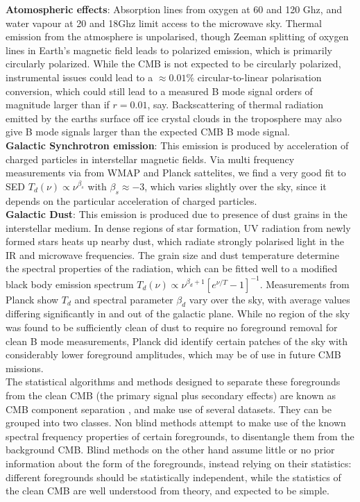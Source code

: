 \documentclass[a4paper,10pt]{article}
\begin{document}
\textbf{Atomospheric effects}: Absorption lines from oxygen at 60 and 120 Ghz, and water vapour at 20 and 18Ghz limit access to the microwave sky. Thermal emission from the atmosphere is unpolarised, though Zeeman splitting of oxygen lines in Earth's magnetic field leads to polarized emission, which is primarily circularly polarized. While the CMB is not expected to be circularly polarized, instrumental issues could lead to a $\approx 0.01\%$ circular-to-linear polarisation conversion, which could still lead to a measured B mode signal orders of magnitude larger than if $r=0.01$, say. Backscattering of thermal radiation emitted by the earths surface off ice  crystal clouds in the troposphere may also give B mode signals larger than the expected CMB B mode signal. \\

\textbf{Galactic Synchrotron emission}: This emission is produced by acceleration of charged particles in interstellar magnetic fields. Via multi frequency measurements via from WMAP and Planck sattelites, we find a very good fit to SED $T_d(\nu) \propto \nu^{\beta_s}$ with $\beta_s \approx -3$, which varies slightly over the sky, since it depends on the particular acceleration of charged particles.\\

\textbf{Galactic Dust}: This emission is produced due to presence of dust grains in the interstellar medium. In dense regions of star formation, UV radiation from newly formed stars heats up nearby dust, which radiate strongly polarised light in the IR and microwave frequencies. The grain size and dust temperature determine the spectral properties of the radiation, which can be fitted well to a modified black body emission spectrum $T_d(\nu) \propto \nu ^ {\beta_d+1}[e^{\nu/T}-1]^{-1}$. Measurements from Planck show $T_d$ and spectral parameter $\beta_d$ vary over the sky, with average values differing significantly in and out of the galactic plane. While no region of the sky was found to be sufficiently clean of dust to require no foreground removal for clean B mode measurements, Planck did identify certain patches of the sky with considerably lower foreground amplitudes, which may be of use in future CMB missions. \\

The statistical algorithms and methods designed to separate these foregrounds from the clean CMB (the primary signal plus secondary effects) are known as CMB component separation \cite{componentsep}, and make use of several datasets. They can be grouped into two classes. Non blind methods attempt to make use of the known spectral frequency properties of certain foregrounds, to disentangle them from the background CMB. Blind methods on the other hand assume little or no prior information about the form of the foregrounds, instead relying on their statistics: different foregrounds should be statistically independent, while the statistics of the clean CMB are well understood from theory, and expected to be simple.\\
\end{document}
